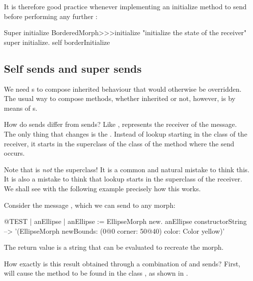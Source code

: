 \documentclass[a4paper,10pt,twoside]{book}
\begin{document}
It is therefore good practice whenever implementing an initialize method to send  before performing any further :

\begin{method}[morphinit]{Super initialize}
BorderedMorph>>>initialize
	"initialize the state of the receiver"
	super initialize.
	self borderInitialize
\end{method}


\subsection{Self sends and super sends}

We need \super {}s to compose inherited behaviour that would otherwise be overridden.
The usual way to compose methods, whether inherited or not, however, is by means of \self {}s.

How do \self sends differ from \super sends?
Like \self, \super represents the receiver of the message.
The only thing that changes is the .
Instead of lookup starting in the class of the receiver, it starts in the superclass of the class of the method where the \super send occurs.

Note that \super is \emph{not} the superclass!
It is a common and natural mistake to think this.
It is also a mistake to think that lookup starts in the superclass of the receiver.
We shall see with the following example precisely how this works.

Consider the message , which we can send to any morph:
\begin{code}{@TEST | anEllipse | anEllipse := EllipseMorph new.}
anEllipse constructorString --> '(EllipseMorph newBounds: (0@0 corner: 50@40) color: Color yellow)'
\end{code}
The return value is a string that can be evaluated to recreate the morph.

How exactly is this result obtained through a combination of \self and \super sends?
First,  will cause the method  to be found in the class ,
as shown in .
\end{document}
